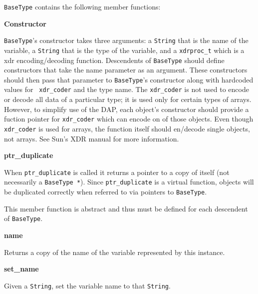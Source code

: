 {\tt BaseType} contains the following member functions:

\begin{description}

\item {\bf Constructor}


{\tt BaseType}'s constructor takes three arguments: a {\tt String} that is
the name of the variable, a {\tt String} that is the type of the variable,
and a {\tt xdrproc\_t} which is a xdr encoding/decoding function.
Descendents of {\tt BaseType} should define constructors that take the name
parameter as an argument. These constructors should then pass that parameter
to {\tt BaseType}'s constructor along with hardcoded values for {\tt
xdr\_coder} and the type name. The {\tt xdr\_coder} is not used to encode
or decode all data of a particular type; it is used only for certain types of
arrays. However, to simplify use of the DAP, each object's constructor should
provide a fuction pointer for {\tt xdr\_coder} which can encode on of those
objects. Even though {\tt xdr\_coder} is used for arrays, the function itself
should en/decode single objects, not arrays. See Sun's XDR manual for more
information\cite{sun:XDR}.

\item {\bf ptr\_duplicate}


When {\tt ptr\_duplicate} is called it returns a pointer to a copy of itself
(not necessarily a {\tt BaseType *}). Since {\tt ptr\_duplicate} is a virtual
function, objects will be duplicated correctly when referred to via pointers
to {\tt BaseType}. 

This member function is abstract and thus must be defined for each descendent
of {\tt BaseType}.

\item {\bf name}


Returns a copy of the name of the variable represented by this instance.

\item {\bf set\_name}


Given a {\tt String}, set the variable name to that {\tt String}.


\end{description}
